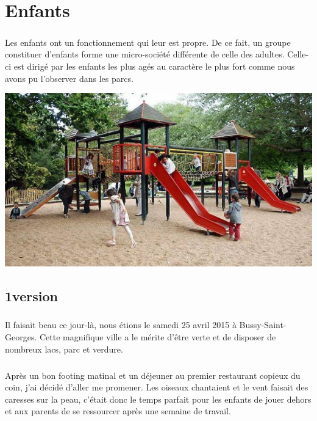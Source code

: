 \chapter{Enfants}

\paragraph{}
Les enfants ont un fonctionnement qui leur est propre. De ce fait, un groupe constituer d'enfants forme une micro-société différente de celle des adultes. Celle-ci est dirigé par les enfants les plus agés au caractère le plus fort comme nous avons pu l'observer dans les parcs.

\begin{center}
	\includegraphics[scale=0.7]{enfants.jpg}
\end{center}

\section{1\iere version}

\paragraph{} Il faisait beau ce jour-là, nous étions le samedi 25 avril 2015 à
Bussy-Saint-Georges. Cette magnifique ville a le mérite d'être verte et de
disposer de nombreux lacs, parc et verdure.

\paragraph{} Après un bon footing matinal et un déjeuner au premier restaurant
copieux du coin, j'ai décidé d'aller me promener. Les oiseaux chantaient et le
vent faisait des caresses sur la peau, c'était donc le temps parfait pour les
enfants de jouer dehors et aux parents de se ressourcer après une semaine de
travail.

